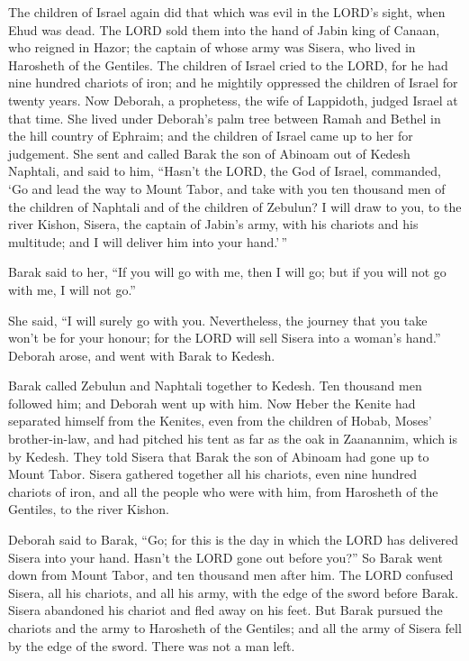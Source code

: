  The children of Israel again did that which was evil in
the LORD's sight, when Ehud was dead.  The LORD sold them
into the hand of Jabin king of Canaan, who reigned in Hazor; the captain
of whose army was Sisera, who lived in Harosheth of the Gentiles.
 The children of Israel cried to the LORD, for he had nine
hundred chariots of iron; and he mightily oppressed the children of
Israel for twenty years.  Now Deborah, a prophetess, the
wife of Lappidoth, judged Israel at that time.  She lived
under Deborah's palm tree between Ramah and Bethel in the hill country
of Ephraim; and the children of Israel came up to her for judgement.
 She sent and called Barak the son of Abinoam out of
Kedesh Naphtali, and said to him, ``Hasn't the LORD, the God of Israel,
commanded, `Go and lead the way to Mount Tabor, and take with you ten
thousand men of the children of Naphtali and of the children of Zebulun?
 I will draw to you, to the river Kishon, Sisera, the
captain of Jabin's army, with his chariots and his multitude; and I will
deliver him into your hand.'\,''

 Barak said to her, ``If you will go with me, then I will
go; but if you will not go with me, I will not go.''

 She said, ``I will surely go with you. Nevertheless, the
journey that you take won't be for your honour; for the LORD will sell
Sisera into a woman's hand.'' Deborah arose, and went with Barak to
Kedesh.

 Barak called Zebulun and Naphtali together to Kedesh.
Ten thousand men followed him; and Deborah went up with him.
 Now Heber the Kenite had separated himself from the
Kenites, even from the children of Hobab, Moses' brother-in-law, and had
pitched his tent as far as the oak in Zaanannim, which is by Kedesh.
 They told Sisera that Barak the son of Abinoam had gone
up to Mount Tabor.  Sisera gathered together all his
chariots, even nine hundred chariots of iron, and all the people who
were with him, from Harosheth of the Gentiles, to the river Kishon.

 Deborah said to Barak, ``Go; for this is the day in
which the LORD has delivered Sisera into your hand. Hasn't the LORD gone
out before you?'' So Barak went down from Mount Tabor, and ten thousand
men after him.  The LORD confused Sisera, all his
chariots, and all his army, with the edge of the sword before Barak.
Sisera abandoned his chariot and fled away on his feet. 
But Barak pursued the chariots and the army to Harosheth of the
Gentiles; and all the army of Sisera fell by the edge of the sword.
There was not a man left.

